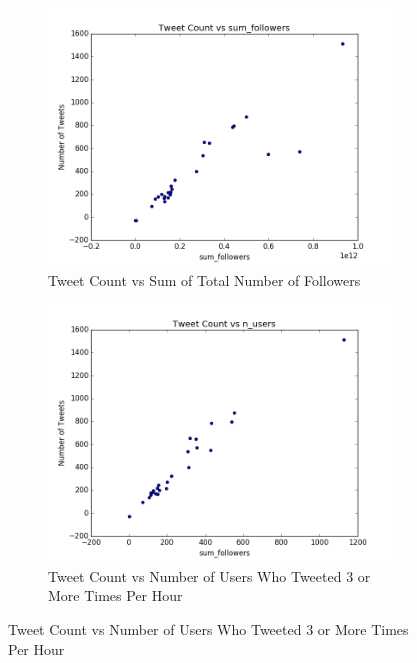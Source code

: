 \documentclass[12pt]{article}
\begin{document}
\begin{figure}[H]
\centering
\begin{subfigure}{.45\textwidth}
  \centering
\includegraphics[width=\textwidth]{figures/count_vs_sum_tweets_nfl.png}
\caption{Tweet Count vs Sum of Total Number of Followers}
\label{part1:fig:LC}
\end{subfigure}%
\hfill
\begin{subfigure}{.45\textwidth}
  \centering
\includegraphics[width=\textwidth]{figures/count_vs_n_users_tweets_nfl.png}
\caption{Tweet Count vs Number of Users Who Tweeted 3 or More Times Per Hour}
\label{part1:fig:LC}
\end{subfigure}


\end{figure}
\end{document}

